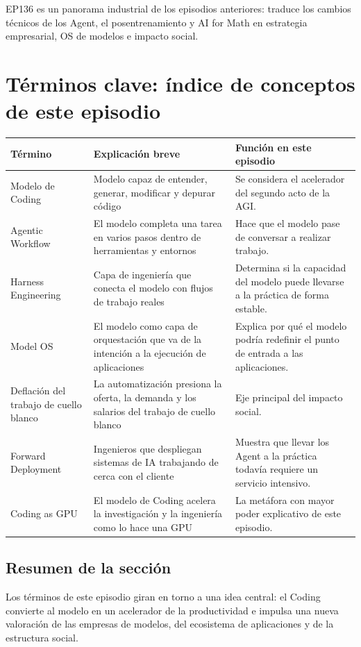 \documentclass[a4paper]{article}
\begin{document}
EP136 es un panorama industrial de los episodios anteriores: traduce los cambios técnicos de los Agent, el posentrenamiento y AI for Math en estrategia empresarial, OS de modelos e impacto social.
\section{Términos clave: índice de conceptos de este episodio}

\begin{longtable}{p{}p{}p{}}
\toprule
Término & Explicación breve & Función en este episodio \\
\midrule
Modelo de Coding & Modelo capaz de entender, generar, modificar y depurar código & Se considera el acelerador del segundo acto de la AGI. \\
Agentic Workflow & El modelo completa una tarea en varios pasos dentro de herramientas y entornos & Hace que el modelo pase de conversar a realizar trabajo. \\
Harness Engineering & Capa de ingeniería que conecta el modelo con flujos de trabajo reales & Determina si la capacidad del modelo puede llevarse a la práctica de forma estable. \\
Model OS & El modelo como capa de orquestación que va de la intención a la ejecución de aplicaciones & Explica por qué el modelo podría redefinir el punto de entrada a las aplicaciones. \\
Deflación del trabajo de cuello blanco & La automatización presiona la oferta, la demanda y los salarios del trabajo de cuello blanco & Eje principal del impacto social. \\
Forward Deployment & Ingenieros que despliegan sistemas de IA trabajando de cerca con el cliente & Muestra que llevar los Agent a la práctica todavía requiere un servicio intensivo. \\
Coding as GPU & El modelo de Coding acelera la investigación y la ingeniería como lo hace una GPU & La metáfora con mayor poder explicativo de este episodio. \\
\bottomrule
\end{longtable}

\subsection{Resumen de la sección}

Los términos de este episodio giran en torno a una idea central: el Coding convierte al modelo en un acelerador de la productividad e impulsa una nueva valoración de las empresas de modelos, del ecosistema de aplicaciones y de la estructura social.
\end{document}
